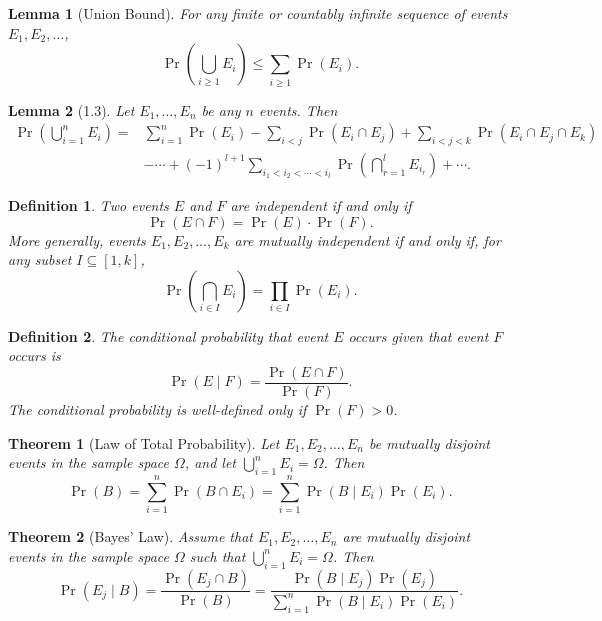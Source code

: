 \documentclass{amsart}
\newtheorem*{definition}{Definition}
\newtheorem*{theorem}{Theorem}
\newtheorem*{lemma}{Lemma}
\begin{document}
\begin{lemma}[Union Bound]
  For any finite or countably infinite sequence of events $E_1, E_2, \ldots$,
  \[
    \Pr \left( \bigcup_{i \geq 1} E_i \right) \leq \sum_{i \geq 1} \Pr(E_i).
  \]
\end{lemma}

\begin{lemma}[1.3]
  Let $E_1, \ldots, E_n$ be any $n$ events. Then
  \begin{align*}
    \Pr \left( \bigcup_{i = 1}^n E_i \right) = & \sum_{i = 1}^n \Pr(E_i) - \sum_{i
    < j} \Pr(E_i \cap E_j) + \sum_{i < j < k} \Pr(E_i \cap E_j \cap E_k) \\
    &- \cdots + {(-1)}^{l + 1} \sum_{i_1 < i_2 < \cdots < i_l} \Pr \left(
    \bigcap_{r = 1}^l E_{i_r} \right) + \cdots.
  \end{align*}
\end{lemma}

\begin{definition}
  Two events $E$ and $F$ are independent if and only if
  \[
    \Pr(E \cap F) = \Pr(E) \cdot \Pr(F).
  \]
  More generally, events $E_1, E_2, \ldots, E_k$ are mutually independent if and
  only if, for any subset $I \subseteq [1, k]$,
  \[
    \Pr \left( \bigcap_{i \in I} E_i \right) = \prod_{i \in I} \Pr(E_i).
  \]
\end{definition}

\begin{definition}
  The conditional probability that event $E$ occurs given that event $F$ occurs
  is
  \[
    \Pr(E \mid F) = \frac{\Pr(E \cap F)}{\Pr(F)}.
  \]
  The conditional probability is well-defined only if $\Pr(F) > 0$.
\end{definition}

\begin{theorem}[Law of Total Probability]
  Let $E_1, E_2, \ldots, E_n$ be mutually disjoint events in the sample space
  $\Omega$, and let $\bigcup_{i = 1}^n E_i = \Omega$. Then
  \[
    \Pr(B) = \sum_{i = 1}^n \Pr(B \cap E_i) = \sum_{i = 1}^n \Pr(B \mid E_i)
    \Pr(E_i).
  \]
\end{theorem}

\begin{theorem}[Bayes' Law]
  Assume that $E_1, E_2, \ldots, E_n$ are mutually disjoint events in the sample
  space $\Omega$ such that $\bigcup_{i = 1}^n E_i = \Omega$. Then
  \[
    \Pr(E_j \mid B) = \frac{\Pr(E_j \cap B)}{\Pr(B)} = \frac{\Pr(B \mid E_j)
    \Pr(E_j)}{\sum_{i = 1}^n \Pr(B \mid E_i) \Pr(E_i)}.
  \]
\end{theorem}
\end{document}
